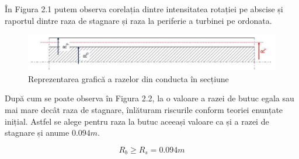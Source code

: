 În Figura 2.1 putem observa corelația dintre intensitatea rotației pe abscise și raportul dintre raza de stagnare și raza la periferie a turbinei pe ordonata.

\begin{figure}[h!]
	\centering
	\includegraphics[scale=0.5]{figures/radii.jpg}
	\caption{Reprezentarea grafică a razelor din conducta în secțiune \cite{susanhub}}
	\label{Reprezentarea grafică a razelor din conducta în secțiune}
\end{figure}

După cum se poate observa în Figura 2.2, la o valoare a razei de butuc egala sau mai mare decât raza de stagnare, înlăturam riscurile conform teoriei enunțate inițial. Astfel se alege pentru raza la butuc aceeași valoare ca și a razei de stagnare și anume $0.094\si{m}$.

\begin{equation}
R_b \geq R_s = 0.094\si{m}
\end{equation}

\clearpage